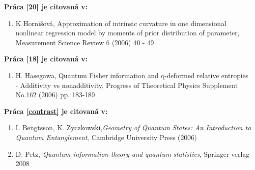\documentclass[A4paper]{article}
\begin{document}
{\bf Pr\'aca [20] je citovan\'a v:}
\begin{enumerate}
\item  K Horni\v sov\'a, Approximation of intrinsic curvature in one
dimensional nonlinear regression model by moments of  prior distribution of
parameter, Measurement Science Review 6 (2006) 40 - 49
  
\end{enumerate}

{\bf Pr\'aca [18] je citovan\'a v:}
\begin{enumerate}
\item  H. Hasegawa, Quantum Fisher information and q-deformed 
relative entropies - Additivity vs nonadditivity, Progress of Theoretical Physics
Supplement No.162 (2006) pp. 183-189

\end{enumerate}


{\bf Pr\'aca \ref{contrast} je citovan\'a v:}
\begin{enumerate}
\item I. Bengtsson, K. Zyczkowski,{\it  Geometry of Quantum States: An Introduction to Quantum Entanglement}, Cambridge University Press (2006)

\item D. Petz, {\it Quantum information theory and quantum statistics}, Springer verlag 2008

\end{enumerate}
\end{document}
